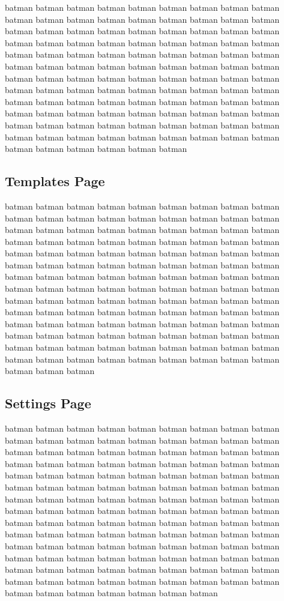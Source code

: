 \documentclass[titlesmallcaps, examinerscopy, copyrightpage]{uqthesis}
\begin{document}
batman batman batman batman batman batman batman batman batman batman batman batman batman batman batman batman batman batman batman batman batman batman batman batman batman batman batman batman batman batman batman batman batman batman batman batman batman batman batman batman batman batman batman batman batman batman batman batman batman batman batman batman batman batman batman batman batman batman batman batman batman batman batman batman batman batman batman batman batman batman batman batman batman batman batman batman batman batman batman batman batman batman batman batman batman batman batman batman batman batman batman batman batman batman batman batman batman batman batman batman batman batman batman batman batman batman batman batman batman batman batman batman batman batman 


\subsection{Templates Page}

batman batman batman batman batman batman batman batman batman batman batman batman batman batman batman batman batman batman batman batman batman batman batman batman batman batman batman batman batman batman batman batman batman batman batman batman batman batman batman batman batman batman batman batman batman batman batman batman batman batman batman batman batman batman batman batman batman batman batman batman batman batman batman batman batman batman batman batman batman batman batman batman batman batman batman batman batman batman batman batman batman batman batman batman batman batman batman batman batman batman batman batman batman batman batman batman batman batman batman batman batman batman batman batman batman batman batman batman batman batman batman batman batman batman batman batman batman batman batman batman batman batman batman batman batman batman batman batman batman 

\subsection{Settings Page}

batman batman batman batman batman batman batman batman batman batman batman batman batman batman batman batman batman batman batman batman batman batman batman batman batman batman batman batman batman batman batman batman batman batman batman batman batman batman batman batman batman batman batman batman batman batman batman batman batman batman batman batman batman batman batman batman batman batman batman batman batman batman batman batman batman batman batman batman batman batman batman batman batman batman batman batman batman batman batman batman batman batman batman batman batman batman batman batman batman batman batman batman batman batman batman batman batman batman batman batman batman batman batman batman batman batman batman batman batman batman batman batman batman batman batman batman batman batman batman batman batman batman batman batman batman batman batman batman batman batman batman batman batman 
\end{document}
